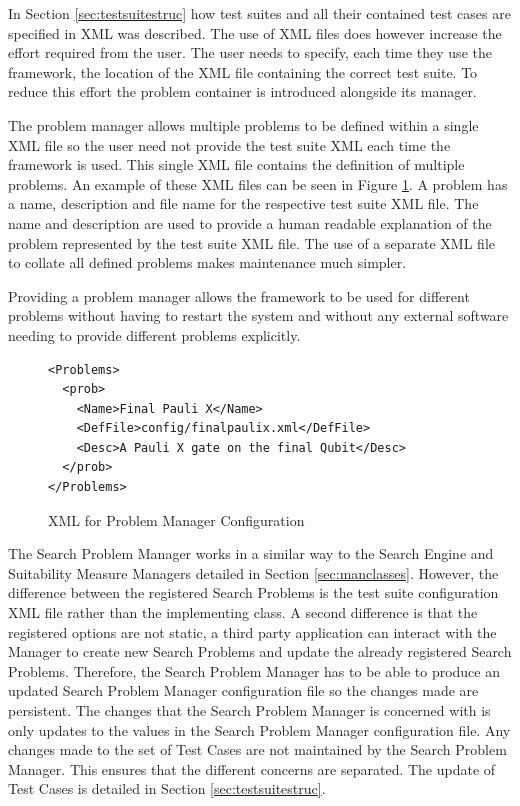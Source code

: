 In Section \ref{sec:testsuitestruc} how test suites and all their contained test cases are specified in XML was described.
The use of XML files does however increase the effort required from the user.
The user needs to specify, each time they use the framework, the location of the XML file containing the correct test suite.
To reduce this effort the problem container is introduced alongside its manager.

The problem manager allows multiple problems to be defined within a single XML file so the user need not provide the test suite XML each time the framework is used.
This single XML file contains the definition of multiple problems.
An example of these XML files can be seen in Figure \ref{code:probmanconfig}.
A problem has a name, description and file name for the respective test suite XML file.
The name and description are used to provide a human readable explanation of the problem represented by the test suite XML file.
The use of a separate XML file to collate all defined problems makes maintenance much simpler.

Providing a problem manager allows the framework to be used for different problems without having to restart the system and without any external software needing to provide different problems explicitly.

\lstset{language=XML}
\begin{figure}
\begin{lstlisting}
<Problems>
  <prob>
    <Name>Final Pauli X</Name>
    <DefFile>config/finalpaulix.xml</DefFile>
    <Desc>A Pauli X gate on the final Qubit</Desc>
  </prob>
</Problems>
\end{lstlisting}
\caption{XML for Problem Manager Configuration}
\label{code:probmanconfig}
\end{figure}

The Search Problem Manager works in a similar way to the Search Engine and Suitability Measure Managers detailed in Section \ref{sec:manclasses}.
However, the difference between the registered Search Problems is the test suite configuration XML file rather than the implementing class.
A second difference is that the registered options are not static, a third party application can interact with the Manager to create new Search Problems and update the already registered Search Problems.
Therefore, the Search Problem Manager has to be able to produce an updated Search Problem Manager configuration file so the changes made are persistent.
The changes that the Search Problem Manager is concerned with is only updates to the values in the Search Problem Manager configuration file.
Any changes made to the set of Test Cases are not maintained by the Search Problem Manager.
This ensures that the different concerns are separated.
The update of Test Cases is detailed in Section \ref{sec:testsuitestruc}.

